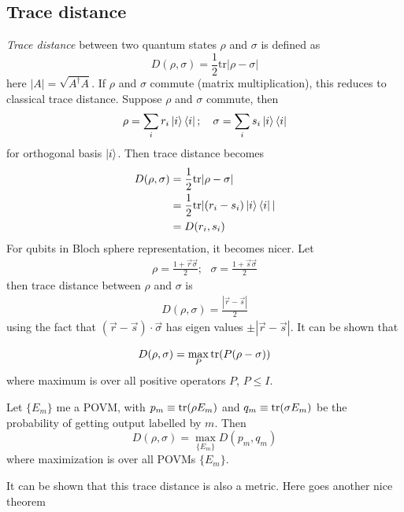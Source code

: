 \subsection{Trace distance}
\textit{Trace distance} between two quantum states $\rho$ and $\sigma$ is defined as
\begin{equation}
    D(\rho, \sigma) = \frac{1}{2}\text{tr} |\rho-\sigma|
\end{equation}
here $|A|=\sqrt{A^\dag A}$. If $\rho$ and $\sigma$ commute (matrix multiplication), this reduces to classical trace distance. Suppose $\rho$ and $\sigma$ commute, then
\begin{align}
    \rho = \sum_i r_i \op{i};
    \ \ \ 
    \sigma = \sum_i s_i \op{i}
\end{align}
for orthogonal basis $\ket{i}$. Then trace distance becomes
\begin{align}
    D(\rho, \sigma) &= \frac{1}{2}\text{tr}|\rho-\sigma| \\
    &= \frac{1}{2}\text{tr}|(r_i-s_i)\ket{i}\bra{i}| \\
    &= D(r_i, s_i)
\end{align}
For qubits in Bloch sphere representation, it becomes nicer. Let
\begin{align}
    \rho = \frac{1+\Vec{r}\Vec{\sigma}}{2};
    \ \ \ 
    \sigma = \frac{1+\Vec{s}\Vec{\sigma}}{2}
\end{align}
then trace distance between $\rho$ and $\sigma$ is
\begin{align}
    D(\rho, \sigma) = \frac{|\Vec{r}-\Vec{s}|}{2}
\end{align}
using the fact that $(\Vec{r}-\Vec{s})\cdot \Vec{\sigma}$ has eigen values $\pm |\Vec{r}-\Vec{s}|$. It can be shown that

\begin{equation}
    D(\rho, \sigma) = \max_P \text{tr}(P(\rho-\sigma))
\end{equation}
where maximum is over all positive operators $P$, $P\leq I$.

\begin{theorem}
    Let $\{ E_m \}$ me a POVM, with $p_m \equiv \text{tr}(\rho E_m)$ and $q_m \equiv \text{tr}(\sigma E_m)$ be the probability of getting output labelled by $m$. Then
    \begin{equation}
        D(\rho, \sigma) = \max_{\{ E_m \} } D(p_m, q_m)
    \end{equation}
    where maximization is over all POVMs $\{ E_m \}$.
\end{theorem}
It can be shown that this trace distance is also a metric. Here goes another nice theorem

